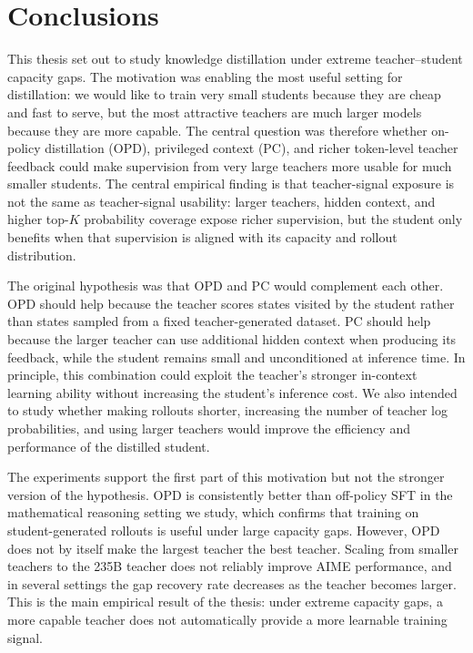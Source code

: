 \chapter{Conclusions}

This thesis set out to study knowledge distillation under extreme teacher--student capacity gaps. The motivation was enabling the most useful setting for distillation: we would like to train very small students because they are cheap and fast to serve, but the most attractive teachers are much larger models because they are more capable. The central question was therefore whether on-policy distillation (OPD), privileged context (PC), and richer token-level teacher feedback could make supervision from very large teachers more usable for much smaller students. The central empirical finding is that teacher-signal exposure is not the same as teacher-signal usability: larger teachers, hidden context, and higher top-$K$ probability coverage expose richer supervision, but the student only benefits when that supervision is aligned with its capacity and rollout distribution.

The original hypothesis was that OPD and PC would complement each other. OPD should help because the teacher scores states visited by the student rather than states sampled from a fixed teacher-generated dataset. PC should help because the larger teacher can use additional hidden context when producing its feedback, while the student remains small and unconditioned at inference time. In principle, this combination could exploit the teacher's stronger in-context learning ability without increasing the student's inference cost. We also intended to study whether making rollouts shorter, increasing the number of teacher log probabilities, and using larger teachers would improve the efficiency and performance of the distilled student.

The experiments support the first part of this motivation but not the stronger version of the hypothesis. OPD is consistently better than off-policy SFT in the mathematical reasoning setting we study, which confirms that training on student-generated rollouts is useful under large capacity gaps. However, OPD does not by itself make the largest teacher the best teacher. Scaling from smaller teachers to the 235B teacher does not reliably improve AIME performance, and in several settings the gap recovery rate decreases as the teacher becomes larger. This is the main empirical result of the thesis: under extreme capacity gaps, a more capable teacher does not automatically provide a more learnable training signal.

